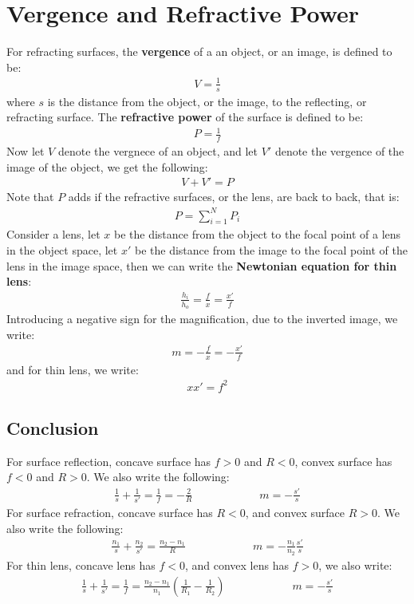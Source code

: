 \documentclass[11pt]{book}
\theoremstyle{break}
\theoremstyle{break}
\begin{document}
\section[Vergence and Refractive Power]{\color{red}Vergence and Refractive Power\color{black}}
For refracting surfaces, the \textbf{vergence} of a an object, or an image, is defined to be:
\begin{align*}
V = \frac{1}{s}
\end{align*}
where $s$ is the distance from the object, or the image, to the reflecting, or refracting surface. The \textbf{refractive power} of the surface is defined to be:
\begin{align*}
P = \frac{1}{f}
\end{align*}
Now let $V$ denote the vergnece of an object, and let $V'$ denote the vergence of the image of the object, we get the following:
\begin{align*}
V+V' = P
\end{align*}
Note that $P$ adds if the refractive surfaces, or the lens, are back to back, that is:
\begin{align*}
P = \sum_{i=1}^N P_i
\end{align*}
Consider a lens, let $x$ be the distance from the object to the focal point of a lens in the object space, let $x'$ be the distance from the image to the focal point of the lens in the image space, then we can write the \textbf{Newtonian equation for thin lens}:
\begin{align*}
\frac{h_i}{h_o} = \frac{f}{x} = \frac{x'}{f}
\end{align*}
Introducing a negative sign for the magnification, due to the inverted image, we write:
\begin{align*}
m = -\frac{f}{x} = -\frac{x'}{f}
\end{align*}
and for thin lens, we write:
\begin{align*}
xx' = f^2
\end{align*}

\newpage
\subsection*{Conclusion}

For surface reflection, concave surface has $f>0$ and $R<0$, convex surface has $f<0$ and $R>0$. We also write the following:
\begin{align*}
\frac{1}{s} + \frac{1}{s'} = \frac{1}{f} =-\frac{2}{R} \qquad \qquad \qquad m=-\frac{s'}{s}
\end{align*}
For surface refraction, concave surface has $R<0$, and convex surface $R>0$. We also write the following:
\begin{align*}
\frac{n_1}{s}+ \frac{n_2}{s'} = \frac{n_2- n_1}{R} \qquad \qquad\qquad m=-\frac{n_1}{n_2} \frac{s'}{s}
\end{align*}
For thin lens, concave lens has $f<0$, and convex lens has $f>0$, we also write:
\begin{align*}
\frac{1}{s}+\frac{1}{s'} = \frac{1}{f} =\frac{n_2-n_1}{n_1}\left( \frac{1}{R_1} - \frac{1}{R_2}\right) \qquad\qquad\qquad m=-\frac{s'}{s}
\end{align*}
\end{document}
